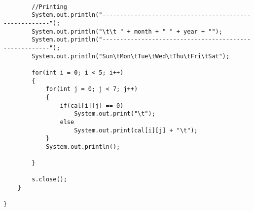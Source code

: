 \documentclass[ProgramminAssignment.tex]{subfiles}
\begin{document}
\begin{lstlisting}
		
		//Printing
		System.out.println("-------------------------------------------------------");
		System.out.println("\t\t " + month + " " + year + "");
		System.out.println("-------------------------------------------------------");
		System.out.println("Sun\tMon\tTue\tWed\tThu\tFri\tSat");
		
		for(int i = 0; i < 5; i++)
		{
			for(int j = 0; j < 7; j++)
			{
				if(cal[i][j] == 0)
					System.out.print("\t");
				else
					System.out.print(cal[i][j] + "\t");
			}
			System.out.println();
				
		}
		
		s.close();
	}

}

\end{lstlisting}
\end{document}
